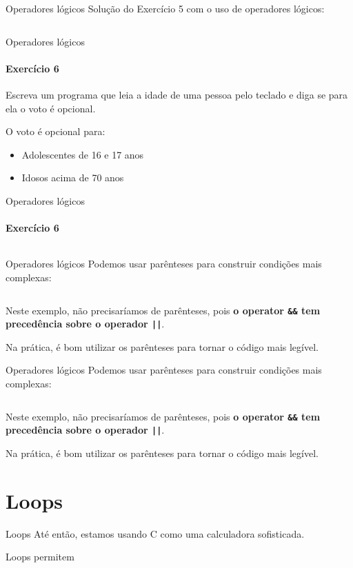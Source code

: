 \documentclass{beamer}
\begin{document}
\begin{frame}{Operadores lógicos}
	Solução do Exercício 5 com o uso de operadores lógicos:
	\inputminted[fontsize=\footnotesize]{c}{resources/logicops.c}
\end{frame}
\begin{frame}{Operadores lógicos}
	\framesubtitle{Exercício 6}
	Escreva um programa que leia a idade de uma pessoa pelo teclado e diga se para ela o voto é opcional.
	
	O voto é opcional para:
	\begin{itemize}
		\item Adolescentes de 16 e 17 anos
		\item Idosos acima de 70 anos
	\end{itemize}
\end{frame}
\begin{frame}{Operadores lógicos}
	\framesubtitle{Exercício 6}
	\inputminted[fontsize=\scriptsize]{c}{resources/ex6.c}
\end{frame}
\begin{frame}{Operadores lógicos}
	Podemos usar parênteses para construir condições mais complexas:
	\inputminted[firstline=8,lastline=8]{c}{resources/ex6.c}
	Neste exemplo, não precisaríamos de parênteses, pois \textbf{o operator \alert{\texttt{\&\&}} tem precedência sobre o operador \alert{\texttt{||}}}.
	
	Na prática, é bom utilizar os parênteses para tornar o código mais legível.
\end{frame}
\begin{frame}{Operadores lógicos}
	Podemos usar parênteses para construir condições mais complexas:
	\inputminted[firstline=8,lastline=8]{c}{resources/ex6.c}
	Neste exemplo, não precisaríamos de parênteses, pois \textbf{o operator \alert{\texttt{\&\&}} tem precedência sobre o operador \alert{\texttt{||}}}.
	
	Na prática, é bom utilizar os parênteses para tornar o código mais legível.
\end{frame}
\section{Loops}
\begin{frame}{Loops}
	Até então, estamos usando C como uma calculadora sofisticada.
	
	Loops permitem 
\end{frame}
\end{document}
